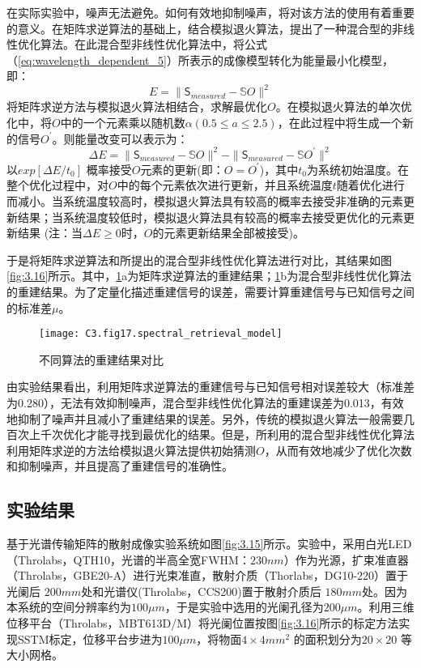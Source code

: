 在实际实验中，噪声无法避免。如何有效地抑制噪声，将对该方法的使用有着重要的意义。在矩阵求逆算法的基础上，结合模拟退火算法，提出了一种混合型的非线性优化算法。在此混合型非线性优化算法中，将公式（\ref{eq:wavelength_dependent_5}）所表示的成像模型转化为能量最小化模型，即：
\begin{equation}
  E = \| \mathsf{S_{\textit{measured}}}-\mathbb{S}O \|^2
\label{eq:wavelength_dependent_6}
\end{equation}
将矩阵求逆方法与模拟退火算法相结合，求解最优化$O$。在模拟退火算法的单次优化中，将$O$中的一个元素乘以随机数$\alpha (0.5≤a≤2.5)$，在此过程中将生成一个新的信号$O^{\prime}$。则能量改变可以表示为：
\begin{equation}
  \Delta E = \| \mathsf{S_{\textit{measured}}}-\mathbb{S}O \|^2-\| \mathsf{S_{\textit{measured}}}-\mathbb{S}O^{\prime} \|^2
\label{eq:wavelength_dependent_7}
\end{equation}
以$exp[ \Delta E / t_0]$ 概率接受$O$元素的更新(即：$O = O^{\prime}$)，其中$t_0$为系统初始温度。在整个优化过程中，对$O$中的每个元素依次进行更新，并且系统温度$t$随着优化进行而减小。当系统温度较高时，模拟退火算法具有较高的概率去接受非准确的元素更新结果；当系统温度较低时，模拟退火算法具有较高的概率去接受更优化的元素更新结果 (注：当$\Delta E \ge 0 $时，$O$的元素更新结果全部被接受)。

于是将矩阵求逆算法和所提出的混合型非线性优化算法进行对比，其结果如图\ref{fig:3.16}所示。其中，\ref{fig:3.17}a为矩阵求逆算法的重建结果；\ref{fig:3.17}b为混合型非线性优化算法的重建结果。为了定量化描述重建信号的误差，需要计算重建信号与已知信号之间的标准差$\mu$。

\begin{figure}[htp]
	\centering
	\texttt{[image: C3.fig17.spectral\_retrieval\_model]}
	\caption{不同算法的重建结果对比}
	\label{fig:3.17}
\end{figure}

由实验结果看出，利用矩阵求逆算法的重建信号与已知信号相对误差较大（标准差为0.280），无法有效抑制噪声，混合型非线性优化算法的重建误差为0.013，有效地抑制了噪声并且减小了重建结果的误差。另外，传统的模拟退火算法一般需要几百次上千次优化才能寻找到最优化的结果。但是，所利用的混合型非线性优化算法利用矩阵求逆的方法给模拟退火算法提供初始猜测$O$，从而有效地减少了优化次数和抑制噪声，并且提高了重建信号的准确性。
\subsection{实验结果}
基于光谱传输矩阵的散射成像实验系统如图\ref{fig:3.15}所示。实验中，采用白光LED（Throlabs，QTH10，光谱的半高全宽FWHM：$230 nm$）作为光源，扩束准直器（Throlabs，GBE20-A）进行光束准直，散射介质（Thorlabs，DG10-220）置于光阑后 $200 mm$处和光谱仪(Throlabs，CCS200)置于散射介质后 $180 mm$处。因为本系统的空间分辨率约为$100 \mu m$，于是实验中选用的光阑孔径为$200 \mu m$。利用三维位移平台（Throlabs，MBT613D/M）将光阑位置按图\ref{fig:3.16}所示的标定方法实现SSTM标定，位移平台步进为$100 \mu m$，将物面$ 4\times 4 mm^2$ 的面积划分为$ 20\times 20$ 等大小网格。

